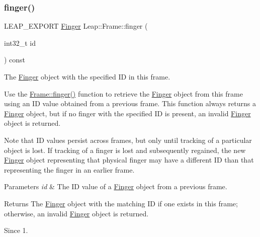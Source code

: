 \subsubsection{\texorpdfstring{finger()}{finger()}}
{\footnotesize\ttfamily L\+E\+A\+P\+\_\+\+E\+X\+P\+O\+RT \hyperlink{class_leap_1_1_finger}{Finger} Leap\+::\+Frame\+::finger (\begin{DoxyParamCaption}\item[{int32\+\_\+t}]{id }\end{DoxyParamCaption}) const}

The \hyperlink{class_leap_1_1_finger}{Finger} object with the specified ID in this frame.

Use the \hyperlink{class_leap_1_1_frame_aca038c853f530defa0fd551146e54259}{Frame\+::finger()} function to retrieve the \hyperlink{class_leap_1_1_finger}{Finger} object from this frame using an ID value obtained from a previous frame. This function always returns a \hyperlink{class_leap_1_1_finger}{Finger} object, but if no finger with the specified ID is present, an invalid \hyperlink{class_leap_1_1_finger}{Finger} object is returned.


\begin{DoxyCodeInclude}
\end{DoxyCodeInclude}


Note that ID values persist across frames, but only until tracking of a particular object is lost. If tracking of a finger is lost and subsequently regained, the new \hyperlink{class_leap_1_1_finger}{Finger} object representing that physical finger may have a different ID than that representing the finger in an earlier frame.


\begin{DoxyParams}{Parameters}
{\em id} & The ID value of a \hyperlink{class_leap_1_1_finger}{Finger} object from a previous frame. \\
\hline
\end{DoxyParams}
\begin{DoxyReturn}{Returns}
The \hyperlink{class_leap_1_1_finger}{Finger} object with the matching ID if one exists in this frame; otherwise, an invalid \hyperlink{class_leap_1_1_finger}{Finger} object is returned. 
\end{DoxyReturn}
\begin{DoxySince}{Since}
1. 
\end{DoxySince}
\mbox{\label{class_leap_1_1_frame_ad26c14d07eae913a7ff17e0ce1f2be12}} 
